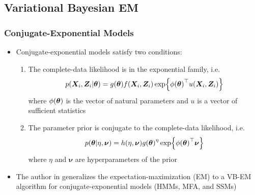 \documentclass[10pt, compress, notheorems, aspectratio=169]{beamer}
\let\originalleft\left
\let\originalright\right
\renewcommand{\left}{\mathopen{}\mathclose \bgroup \originalleft}
\renewcommand{\right}{\aftergroup \egroup \originalright}
\begin{document}
\subsection{Variational Bayesian EM}
\begin{frame}
	\frametitle{Conjugate-Exponential Models}
	\begin{itemize}
		\item Conjugate-exponential models satisfy two conditions:
			\begin{enumerate}
				\item The complete-data likelihood is in the exponential family, i.e.
					\begin{equation}
						p \left( {\bm X}_i, {\bm Z}_i | {\bm \theta} \right) = g \left( {\bm \theta} \right) f \left( {\bm X}_i, {\bm Z}_i \right) \exp \left\{ \phi \left( {\bm \theta} \right)^{\top} u \left( {\bm X}_i, {\bm Z}_i \right) \right\} \label{ce-1}
					\end{equation}
					where $\phi \left( {\bm \theta} \right)$ is the vector of natural parameters and $u$ is a vector of sufficient statistics
				\item The parameter prior is conjugate to the complete-data likelihood, i.e.
					\begin{equation}
						p \left( {\bm \theta} | \eta, {\bm \nu} \right) = h \left( \eta, {\bm \nu} \right) g \left( {\bm \theta} \right)^{\eta} \exp \left\{ \phi \left( {\bm \theta} \right)^{\top} {\bm \nu} \right\} \label{ce-2}
					\end{equation}
					where $\eta$ and ${\bm \nu}$ are hyperparameters of the prior
			\end{enumerate}
		\item The author in \cite{bealVariationalAlgorithmsApproximate} generalizes the expectation-maximization (EM) to a VB-EM algorithm for conjugate-exponential models (HMMs, MFA, and SSMs)
	\end{itemize}
\end{frame}
\end{document}
